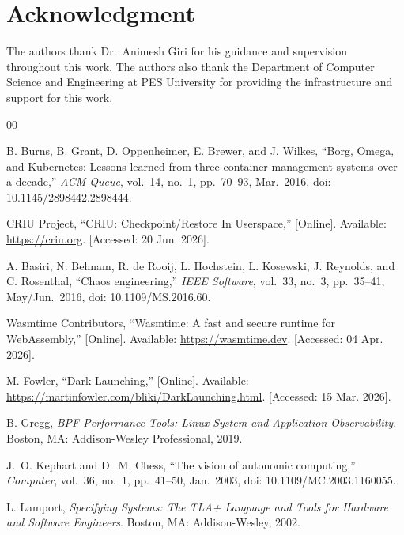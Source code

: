 \documentclass[conference]{IEEEtran}
\begin{document}
\section*{Acknowledgment}

The authors thank Dr.\ Animesh Giri for his guidance and supervision throughout this work. The authors also thank the Department of Computer Science and Engineering at PES University for providing the infrastructure and support for this work.

\begin{thebibliography}{00}

B. Burns, B. Grant, D. Oppenheimer, E. Brewer, and J. Wilkes, ``Borg, Omega, and Kubernetes: Lessons learned from three container-management systems over a decade,'' \textit{ACM Queue}, vol.~14, no.~1, pp.~70--93, Mar.\ 2016, doi: 10.1145/2898442.2898444.

CRIU Project, ``CRIU: Checkpoint/Restore In Userspace,'' [Online]. Available: \url{https://criu.org}. [Accessed: 20 Jun. 2026].

A. Basiri, N. Behnam, R. de Rooij, L. Hochstein, L. Kosewski, J. Reynolds, and C. Rosenthal, ``Chaos engineering,'' \textit{IEEE Software}, vol.~33, no.~3, pp.~35--41, May/Jun.\ 2016, doi: 10.1109/MS.2016.60.

Wasmtime Contributors, ``Wasmtime: A fast and secure runtime for WebAssembly,'' [Online]. Available: \url{https://wasmtime.dev}. [Accessed: 04 Apr. 2026].

M. Fowler, ``Dark Launching,'' [Online]. Available: \url{https://martinfowler.com/bliki/DarkLaunching.html}. [Accessed: 15 Mar. 2026].

B. Gregg, \textit{BPF Performance Tools: Linux System and Application Observability}. Boston, MA: Addison-Wesley Professional, 2019.

J.~O. Kephart and D.~M. Chess, ``The vision of autonomic computing,'' \textit{Computer}, vol.~36, no.~1, pp.~41--50, Jan.\ 2003, doi: 10.1109/MC.2003.1160055.

L. Lamport, \textit{Specifying Systems: The TLA+ Language and Tools for Hardware and Software Engineers}. Boston, MA: Addison-Wesley, 2002.

\end{thebibliography}
\end{document}

